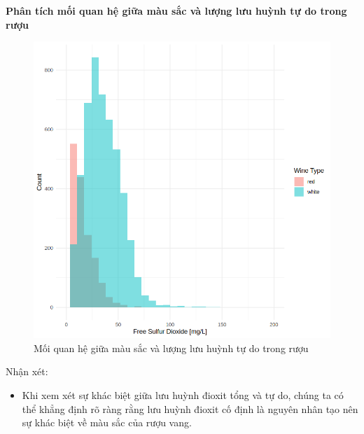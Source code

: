 \textbf{Phân tích mối quan hệ giữa màu sắc và lượng lưu huỳnh tự do trong rượu}
\begin{figure}[H]
    \centering
    \includegraphics[width=0.75\columnwidth]{wine_colors/wine_color_freesulfur.png}
    \caption{Mối quan hệ giữa màu sắc và lượng lưu huỳnh tự do trong rượu}
    \label{fig:wine_color_freesulfur}
\end{figure}
Nhận xét:
\begin{itemize}
    \item Khi xem xét sự khác biệt giữa lưu huỳnh đioxit tổng và tự do, chúng ta có thể khẳng định rõ ràng rằng lưu huỳnh đioxit cố định là nguyên nhân tạo nên sự khác biệt về màu sắc của rượu vang.
\end{itemize}

